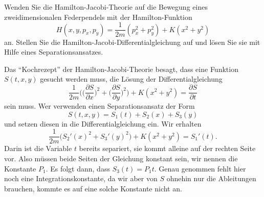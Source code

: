 Wenden Sie die Hamilton-Jacobi-Theorie auf die Bewegung eines
zweidimensionalen Federpendels mit der Hamilton-Funktion 
\[
H(x,y,p_x,p_y)=\frac1{2m}(p_x^2+p_y^2)+K(x^2 + y^2)
\]
an. Stellen Sie die Hamilton-Jacobi-Differentialgleichung auf
und lösen Sie sie mit Hilfe eines Separationsansatzes.

\begin{loesung}
Das ``Kochrezept'' der Hamilton-Jacobi-Theorie besagt, dass eine
Funktion $S(t, x, y)$ gesucht werden muss, die Lösung
der Differentialgleichung
\[
\frac1{2m}\biggl(
\biggl(\frac{\partial S}{\partial x}\biggr)^2
+
\biggl(\frac{\partial S}{\partial y}\biggr)^2
\biggr)+K(x^2+y^2)=\frac{\partial S}{\partial t}
\]
sein muss. Wer verwenden einen Separationsansatz der Form
\[
S(t,x,y)=S_1(t)+S_2(x)+S_3(y)
\]
und setzen diesen in die Differentialgleichung ein.
Wir erhalten
\[
\frac1{2m}\bigl( S_2'(x)^2+S_3'(y)^2 \bigr)+K(x^2+y^2)=S_1'(t).
\]
Darin ist die Variable $t$ bereits separiert, sie kommt alleine auf
der rechten Seite vor. Also müssen beide Seiten der Gleichung konstant
sein, wir nennen die Konstante $P_1$. Es folgt dann, dass 
$S_3(t)=P_1t$.
Genau genommen fehlt hier noch eine Integrationskonstante, da wir aber
von $S$ ohnehin nur die Ableitungen brauchen, kommte es auf eine solche
Konstante nicht an.


\end{loesung}
